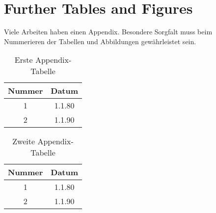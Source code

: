 \documentclass[twoside,12pt,a4paper]{report}
\begin{document}
\chapter{Further Tables and Figures}\label{chap:App}
Viele Arbeiten haben einen Appendix. Besondere Sorgfalt muss beim Nummerieren der Tabellen und Abbildungen gewährleistet sein.
\begin{table}[htb]
\begin{tabular}{cc}
Nummer & Datum \\
\hline
1 & 1.1.80\\
2 & 1.1.90 \\
\end{tabular}
\caption{Erste Appendix-Tabelle}\label{tab:app1}
\end{table}


\begin{table}[htb]
\begin{tabular}{cc}
Nummer & Datum \\
\hline
1 & 1.1.80\\
2 & 1.1.90 \\
\end{tabular}
\caption{Zweite Appendix-Tabelle}\label{tab:app2}
\end{table}

\cleardoublepage





\cleardoublepage
\thispagestyle{empty}
\end{document}
